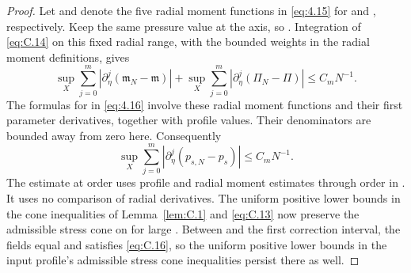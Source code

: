 \begin{proof}
%
Let  and  denote the five radial moment functions in \eqref{eq:4.15} for
and , respectively. Keep the same pressure value  at the axis, so
.
Integration of \eqref{eq:C.14} on this fixed radial range, with the bounded weights in the radial
moment definitions, gives
\begin{equation}
 \sup_X\sum_{j=0}^m\left|\partial_\eta^j(\mathfrak m_N-\mathfrak m)\right|
 +\sup_X\sum_{j=0}^m\left|\partial_\eta^j(\Pi_N-\Pi)\right|
 \leq C_mN^{-1}.
\tag{C.15}\label{eq:C.15}
\end{equation}
The formulas for  in \eqref{eq:4.16} involve these radial moment functions and their first
parameter derivatives, together with profile values. Their denominators are bounded away
from zero here. Consequently
\begin{equation}
 \sup_X\sum_{j=0}^m\left|\partial_\eta^j(p_{s,N}-p_s)\right|
 \leq C_mN^{-1}.
\tag{C.16}\label{eq:C.16}
\end{equation}
The estimate at order  uses profile and radial moment estimates through order
 in .
It uses no comparison of radial derivatives. The uniform positive lower bounds in the cone
inequalities of Lemma~\ref{lem:C.1} and \eqref{eq:C.13} now preserve the admissible stress cone on
 for large
. Between  and the first correction interval, the fields equal
 and  satisfies
\eqref{eq:C.16}, so the uniform positive lower bounds in the input profile's admissible stress cone
inequalities persist there as well.


\end{proof}
